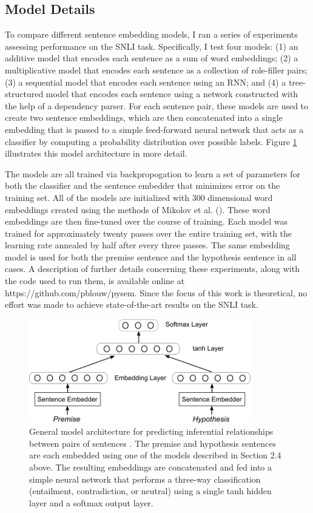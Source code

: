 \subsection{Model Details}

To compare different sentence embedding models, I ran a series of experiments assessing performance on the SNLI task. Specifically, I test four models: (1) an additive model that encodes each sentence as a sum of word embeddings; (2) a multiplicative model that encodes each sentence as a collection of role-filler pairs; (3) a sequential model that encodes each sentence using an RNN; and (4) a tree-structured model that encodes each sentence using a network constructed with the help of a dependency parser. For each sentence pair, these models are used to create two sentence embeddings, which are then concatenated into a single embedding that is passed to a simple feed-forward neural network that acts as a classifier by computing a probability distribution over possible labels. Figure \ref{fig:model} illustrates this model architecture in more detail. 

The models are all trained via backpropogation to learn a set of parameters for both the classifier and the sentence embedder that minimizes error on the training set. All of the models are initialized with 300 dimensional word embeddings created using the methods of Mikolov et al. (\citeyear{Mikolov:2013}). These word embeddings are then fine-tuned over the course of training. Each model was trained for approximately twenty passes over the entire training set, with the learning rate annealed by half after every three passes. The same embedding model is used for both the premise sentence and the hypothesis sentence in all cases. A description of further details concerning these experiments, along with the code used to run them, is available online at https://github.com/pblouw/pysem. Since the focus of this work is theoretical, no effort was made to achieve state-of-the-art results on the SNLI task.

\begin{figure}
\centering
	\includegraphics[width=3.8in]{figures/classifier.png}
	\caption{General model architecture for predicting inferential relationships between pairs of sentences \citep[see][]{Bowman:2015}. The premise and hypothesis sentences are each embedded using one of the models described in Section 2.4 above. The resulting embeddings are concatenated and fed into a simple neural network that performs a three-way classification (entailment, contradiction, or neutral) using a single tanh hidden layer and a softmax output layer.}\label{fig:model}
\end{figure}

